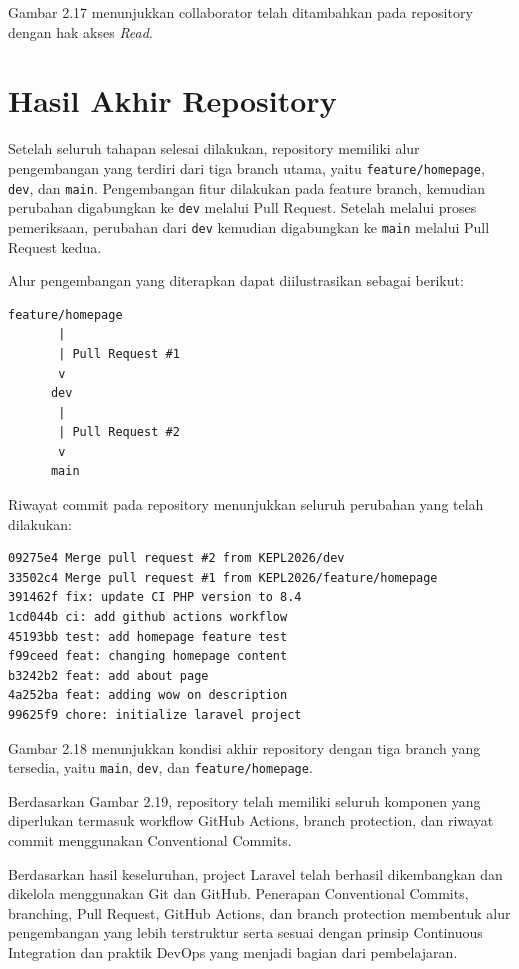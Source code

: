 Gambar 2.17 menunjukkan collaborator telah ditambahkan pada repository dengan hak akses \textit{Read}.

\section{Hasil Akhir Repository}

Setelah seluruh tahapan selesai dilakukan, repository memiliki alur pengembangan yang terdiri dari tiga branch utama, yaitu \texttt{feature/homepage}, \texttt{dev}, dan \texttt{main}. Pengembangan fitur dilakukan pada feature branch, kemudian perubahan digabungkan ke \texttt{dev} melalui Pull Request. Setelah melalui proses pemeriksaan, perubahan dari \texttt{dev} kemudian digabungkan ke \texttt{main} melalui Pull Request kedua.

Alur pengembangan yang diterapkan dapat diilustrasikan sebagai berikut:

\begin{lstlisting}
feature/homepage
       |
       | Pull Request #1
       v
      dev
       |
       | Pull Request #2
       v
      main
\end{lstlisting}

Riwayat commit pada repository menunjukkan seluruh perubahan yang telah dilakukan:

\begin{lstlisting}
09275e4 Merge pull request #2 from KEPL2026/dev
33502c4 Merge pull request #1 from KEPL2026/feature/homepage
391462f fix: update CI PHP version to 8.4
1cd044b ci: add github actions workflow
45193bb test: add homepage feature test
f99ceed feat: changing homepage content
b3242b2 feat: add about page
4a252ba feat: adding wow on description
99625f9 chore: initialize laravel project
\end{lstlisting}


Gambar 2.18 menunjukkan kondisi akhir repository dengan tiga branch yang tersedia, yaitu \texttt{main}, \texttt{dev}, dan \texttt{feature/homepage}.


Berdasarkan Gambar 2.19, repository telah memiliki seluruh komponen yang diperlukan termasuk workflow GitHub Actions, branch protection, dan riwayat commit menggunakan Conventional Commits.

Berdasarkan hasil keseluruhan, project Laravel telah berhasil dikembangkan dan dikelola menggunakan Git dan GitHub. Penerapan Conventional Commits, branching, Pull Request, GitHub Actions, dan branch protection membentuk alur pengembangan yang lebih terstruktur serta sesuai dengan prinsip Continuous Integration dan praktik DevOps yang menjadi bagian dari pembelajaran.
